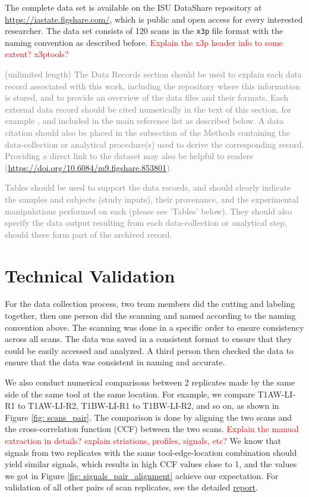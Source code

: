 \documentclass[fleqn,10pt]{wlscirep}
\begin{document}
The complete data set is available on the ISU DataShare repository at
\href{https://iastate.figshare.com/}{https://iastate.figshare.com/},
which is public and open access for every interested researcher. The
data set consists of 120 scans in the \texttt{x3p} file format with the
naming convention as described before.
\textcolor{red}{Explain the x3p header info to some extent? x3ptools?}

\textcolor{gray}{(unlimited length) The Data Records section should be used to explain each data record associated with this work, including the repository where this information is stored, and to provide an overview of the data files and their formats. Each external data record should be cited numerically in the text of this section, for example \cite{Hao:gidmaps:2014}, and included in the main reference list as described below. A data citation should also be placed in the subsection of the Methods containing the data-collection or analytical procedure(s) used to derive the corresponding record. Providing a direct link to the dataset may also be helpful to readers (\hyperlink{https://doi.org/10.6084/m9.figshare.853801}{https://doi.org/10.6084/m9.figshare.853801}).}

\textcolor{gray}{Tables should be used to support the data records, and should clearly indicate the samples and subjects (study inputs), their provenance, and the experimental manipulations performed on each (please see 'Tables' below). They should also specify the data output resulting from each data-collection or analytical step, should these form part of the archived record.}

\section*{Technical Validation}

For the data collection process, two team members did the cutting and
labeling together, then one person did the scanning and named according
to the naming convention above. The scanning was done in a specific
order to ensure consistency across all scans. The data was saved in a
consistent format to ensure that they could be easily accessed and
analyzed. A third person then checked the data to ensure that the data
was consistent in naming and accurate.

We also conduct numerical comparisons between 2 replicates made by the
same side of the same tool at the same location. For example, we compare
T1AW-LI-R1 to T1AW-LI-R2, T1BW-LI-R1 to T1BW-LI-R2, and so on, as shown
in Figure \ref{fig: scans_pair}. The comparison is done by aligning the
two scans and the cross-correlation function (CCF) between the two
scans.
\textcolor{red}{Explain the manual extraction in details? explain striations, profiles, signals, etc?}
We know that signals from two replicates with the same
tool-edge-location combination should yield similar signals, which
results in high CCF values close to 1, and the values we got in Figure
\ref{fig: signals_pair_alignment} achieve our expectation. For
validation of all other pairs of scan replicates, see the detailed
\href{https://heike.github.io/Wirecuts/data-descriptor/Technical_Validation.html}{report}.
\end{document}
